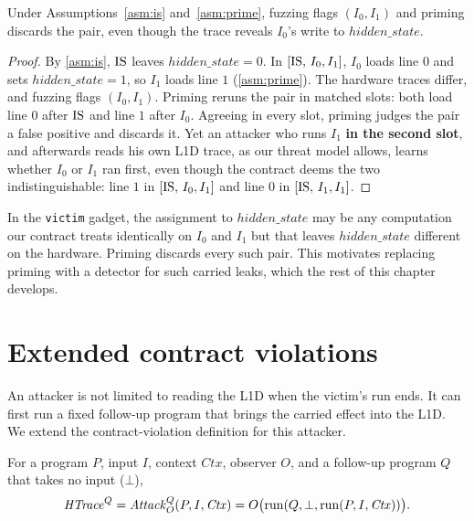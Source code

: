 \begin{proposition}
\label{prop:priming-blind}
Under Assumptions~\ref{asm:is} and~\ref{asm:prime}, fuzzing flags $(I_0,I_1)$ and priming discards
the pair, even though the trace reveals $I_0$'s write to $\mathit{hidden\_state}$.
\end{proposition}
\begin{proof}
By \autoref{asm:is}, $\mathrm{IS}$ leaves $\mathit{hidden\_state}=0$. In $[\mathrm{IS},\,I_0,I_1]$, $I_0$ loads line
$0$ and sets $\mathit{hidden\_state}=1$, so $I_1$ loads line $1$ (\autoref{asm:prime}). The hardware
traces differ, and fuzzing flags $(I_0,I_1)$. Priming reruns the pair in matched slots: both load
line $0$ after $\mathrm{IS}$ and line $1$ after $I_0$. Agreeing in every slot, priming judges the pair a
false positive and discards it. Yet an attacker who runs $I_1$ \textbf{in the second slot}, and
afterwards reads his own L1D trace, as our threat model allows, learns whether $I_0$ or $I_1$ ran
first, even though the contract deems the two indistinguishable: line $1$ in $[\mathrm{IS},\,I_0,I_1]$ and
line $0$ in $[\mathrm{IS},\,I_1,I_1]$.
\end{proof}

\noindent In the \texttt{victim} gadget, the assignment to $\mathit{hidden\_state}$ may be any
computation our contract treats identically on $I_0$ and $I_1$ but that leaves
$\mathit{hidden\_state}$ different on the hardware. Priming discards every such pair. This motivates
replacing priming with a detector for such carried leaks, which the rest of this chapter develops.

\section{Extended contract violations}
\label{sec:priming-extend}

An attacker is not limited to reading the L1D when the victim's run ends. It can first run a fixed
follow-up program that brings the carried effect into the L1D. We extend the contract-violation
definition for this attacker.

\begin{definition}
\label{def:prime-qtrace}
For a program $P$, input $I$, context $\mathit{Ctx}$, observer $O$, and a follow-up program $Q$
that takes no input ($\bot$),
\begin{equation}
\mathit{HTrace}^Q = \mathit{Attack}^{Q}_{O}(P,I,\mathit{Ctx}) = O\big(\mathrm{run}(Q,\bot,\mathrm{run}(P,I,\mathit{Ctx}))\big).
\end{equation}
\end{definition}

